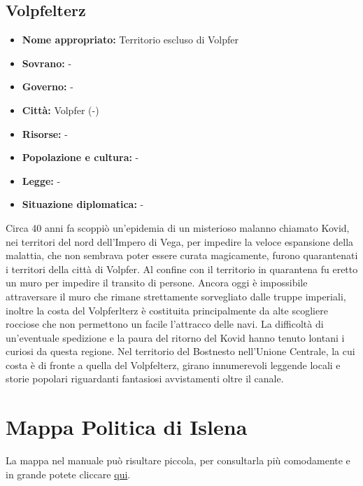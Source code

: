 \documentclass[10pt, a4paper]{report}
\begin{document}
\begin{multicols}{2}
\subsection*{Volpfelterz}
\begin{itemize}
	\item \textbf{Nome appropriato:} Territorio escluso di Volpfer
	\item \textbf{Sovrano:} - 
	\item \textbf{Governo:} -
	\item \textbf{Città:}  Volpfer (-)
	\item \textbf{Risorse:} -
	\item \textbf{Popolazione e cultura:} -
	\item \textbf{Legge:} -
	\item \textbf{Situazione diplomatica:} - 
\end{itemize}
Circa 40 anni fa scoppiò un'epidemia di un misterioso malanno chiamato Kovid, nei territori del nord dell'Impero di Vega, per impedire la veloce espansione della malattia, che non sembrava poter essere curata magicamente, furono quarantenati i territori della città di Volpfer. Al confine con il territorio in quarantena fu eretto un muro per impedire il transito di persone. Ancora oggi è impossibile attraversare il muro che rimane strettamente sorvegliato dalle truppe imperiali, inoltre la costa del Volpferlterz è costituita principalmente da alte scogliere rocciose che non permettono un facile l'attracco delle navi. La difficoltà di un'eventuale spedizione e la paura del ritorno del Kovid hanno tenuto lontani i curiosi da questa regione. Nel territorio del Bostnesto nell'Unione Centrale, la cui costa è di fronte a quella del Volpfelterz, girano innumerevoli leggende locali e storie popolari riguardanti fantasiosi avvistamenti oltre il canale.

\end{multicols}
\vspace*{2.5cm}

\section{Mappa Politica di Islena}

La mappa nel manuale può risultare piccola, per consultarla più comodamente e in grande potete cliccare \href{https://raw.githubusercontent.com/Emipano/Islena-Ambientazione-DnD/main/imgs/islena_politica.jpeg}{qui}.
\end{document}
